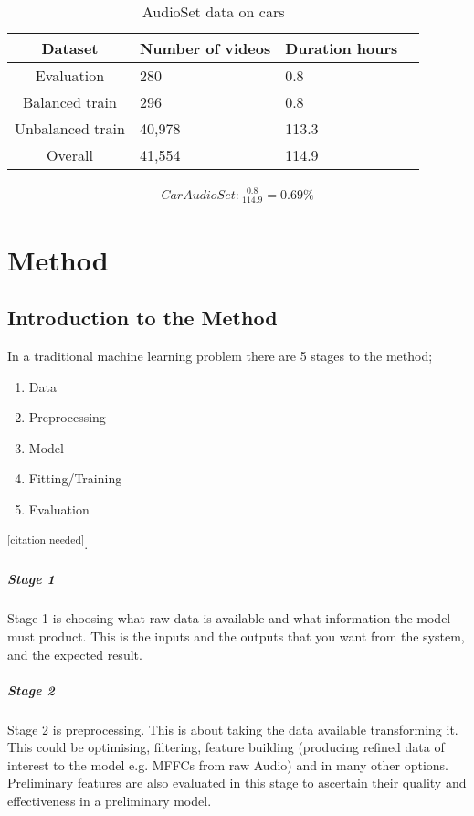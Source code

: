 \documentclass{UoNMCHA}
\newcommand{\citationneeded}{\textsuperscript{\color{blue} [citation needed]}}
\numberwithin{equation}{section}
\begin{document}
\begin{table}[h!]
    \begin{center}
        \caption{AudioSet data on cars}\label{tab:AudioSetCars}
        {\footnotesize
            \begin{tabular}{c l l l|}
                \hline\hline Dataset & Number of videos & Duration hours \\ \hline 
                Evaluation & 280 & 0.8 \\
                Balanced train & 296 & 0.8 \\
                Unbalanced train & 40,978 & 113.3 \\
                Overall & 41,554 & 114.9 \\
                \hline
            \end{tabular}
        }
    \end{center}
\end{table}
\begin{gather*}
    Car AudioSet:  \frac{0.8}{114.9}=0.69\%
\end{gather*}

\section{Method} \label{sec:Method}
\subsection{Introduction to the Method}
In a traditional machine learning problem there are 5 stages to the method; 

\begin{enumerate}[start=1,label={Stage \arabic*:}]
    \item Data
    \item Preprocessing
    \item Model
    \item Fitting/Training
    \item Evaluation
\end{enumerate}

\citationneeded.

\subparagraph{Stage 1}
Stage 1 is choosing what raw data is available and what information the model must product. This is the inputs and the outputs that you want from the system, and the expected result.

\subparagraph{Stage 2}
Stage 2 is preprocessing. This is about taking the data available transforming it. This could be optimising, filtering, feature building (producing refined data of interest to the model e.g. MFFCs from raw Audio) and in many other options. Preliminary features are also evaluated in this stage to ascertain their quality and effectiveness in a preliminary model.
\end{document}
